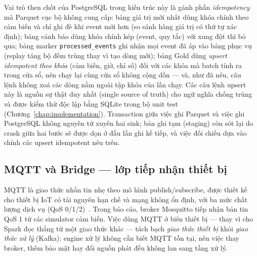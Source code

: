 Vai trò then chốt của PostgreSQL trong kiến trúc này là gánh phần
\emph{idempotency} mà Parquet cục bộ không cung cấp: bảng giá trị mới nhất
dùng khóa chính theo cảm biến và chỉ ghi đè khi event mới hơn (so sánh
hàng giá trị có thứ tự xác định); bảng cảnh báo dùng khóa chính kép
(event, quy tắc) với xung đột thì bỏ qua; bảng marker
\texttt{processed\_events} ghi nhận mọi event đã áp vào bảng phục vụ
(replay tăng bộ đếm trùng thay vì tạo dòng mới); bảng Gold dùng
\emph{upsert idempotent theo khóa} (cảm biến, giờ, chỉ số) đối với các khóa
mà batch tính ra trong cửa sổ, nên chạy lại cùng cửa sổ không cộng dồn ---
và, như đã nêu, câu lệnh không xoá các dòng nằm ngoài tập khóa của lần chạy.
Các câu lệnh upsert này là nguồn sự thật duy nhất (single source of truth)
cho ngữ nghĩa chống trùng và được kiểm thử độc lập bằng SQLite trong bộ
unit test (Chương~\ref{chap:implementation}). Transaction giữa việc ghi
Parquet và việc ghi PostgreSQL không nguyên tử xuyên hai sink; bản ghi tạm
(staging) còn sót lại do crash giữa hai bước sẽ được dọn ở đầu lần ghi kế
tiếp, và việc đối chiếu dựa vào chính các upsert idempotent nêu trên.

\subsection{MQTT và Bridge --- lớp tiếp nhận thiết bị}

MQTT là giao thức nhắn tin nhẹ theo mô hình publish/subscribe, được thiết
kế cho thiết bị IoT có tài nguyên hạn chế và mạng không ổn định, với ba
mức chất lượng dịch vụ (QoS 0/1/2)~\cite{mqtt_v311_spec}. Trong báo cáo,
broker Mosquitto tiếp nhận bản tin QoS 1 từ các simulator cảm biến. Việc
dùng MQTT ở biên thiết bị --- thay vì cho Spark đọc thẳng từ một giao thức
khác --- tách bạch \emph{giao thức thiết bị} khỏi \emph{giao thức xử lý}
(Kafka): engine xử lý không cần biết MQTT tồn tại, nên việc thay broker,
thêm bảo mật hay đổi nguồn phát đều không lan sang tầng xử lý.

